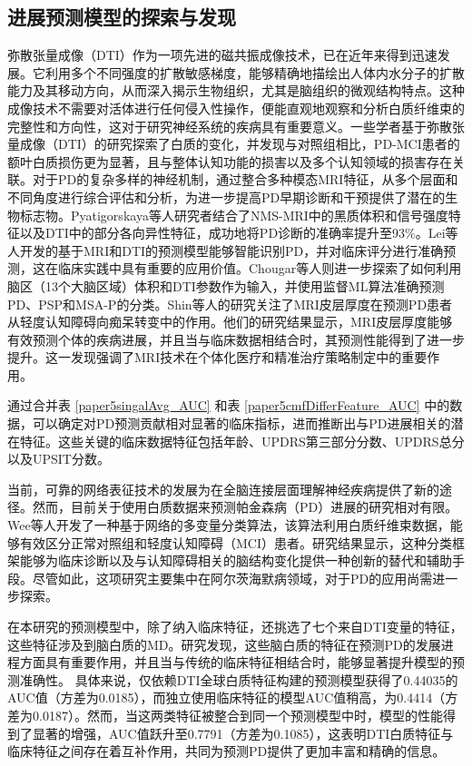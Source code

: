 \subsection{进展预测模型的探索与发现}  
弥散张量成像（DTI）作为一项先进的磁共振成像技术，已在近年来得到迅速发展。它利用多个不同强度的扩散敏感梯度，能够精确地描绘出人体内水分子的扩散能力及其移动方向，从而深入揭示生物组织，尤其是脑组织的微观结构特点。这种成像技术不需要对活体进行任何侵入性操作，便能直观地观察和分析白质纤维束的完整性和方向性，这对于研究神经系统的疾病具有重要意义。一些学者基于弥散张量成像（DTI）的研究探索了白质的变化，并发现与对照组相比，PD-MCI患者的额叶白质损伤更为显著，且与整体认知功能的损害以及多个认知领域的损害存在关联\cite{wang2020changes}。对于PD的复杂多样的神经机制，通过整合多种模态MRI特征，从多个层面和不同角度进行综合评估和分析，为进一步提高PD早期诊断和干预提供了潜在的生物标志物\cite{pyatigorskaya2018comparative,gu2016automatic,bowman2016multimodal}。Pyatigorskaya等人\cite{pyatigorskaya2018comparative}研究者结合了NMS-MRI中的黑质体积和信号强度特征以及DTI中的部分各向异性特征，成功地将PD诊断的准确率提升至93\%。Lei等人\cite{lei2018longitudinal,lei2017joint}开发的基于MRI和DTI的预测模型能够智能识别PD，并对临床评分进行准确预测，这在临床实践中具有重要的应用价值。Chougar等人\cite{chougar2021automated}则进一步探索了如何利用脑区（13个大脑区域）体积和DTI参数作为输入，并使用监督ML算法准确预测PD、PSP和MSA-P的分类。Shin等人\cite{shin2021cortical}的研究关注了MRI皮层厚度在预测PD患者从轻度认知障碍向痴呆转变中的作用。他们的研究结果显示，MRI皮层厚度能够有效预测个体的疾病进展，并且当与临床数据相结合时，其预测性能得到了进一步提升。这一发现强调了MRI技术在个体化医疗和精准治疗策略制定中的重要作用。

通过合并表 \ref{paper5singalAvg_AUC} 和表 \ref{paper5cmfDifferFeature_AUC} 中的数据，可以确定对PD预测贡献相对显著的临床指标，进而推断出与PD进展相关的潜在特征。这些关键的临床数据特征包括年龄、UPDRS第三部分分数、UPDRS总分以及UPSIT分数。

当前，可靠的网络表征技术的发展为在全脑连接层面理解神经疾病提供了新的途径。然而，目前关于使用白质数据来预测帕金森病（PD）进展的研究相对有限。Wee等人\cite{wee2011enriched}开发了一种基于网络的多变量分类算法，该算法利用白质纤维束数据，能够有效区分正常对照组和轻度认知障碍（MCI）患者。研究结果显示，这种分类框架能够为临床诊断以及与认知障碍相关的脑结构变化提供一种创新的替代和辅助手段。尽管如此，这项研究主要集中在阿尔茨海默病领域，对于PD的应用尚需进一步探索。


在本研究的预测模型中，除了纳入临床特征，还挑选了七个来自DTI变量的特征，这些特征涉及到脑白质的MD。研究发现，这些脑白质的特征在预测PD的发展进程方面具有重要作用，并且当与传统的临床特征相结合时，能够显著提升模型的预测准确性。
具体来说，仅依赖DTI全球白质特征构建的预测模型获得了0.44035的AUC值（方差为0.0185），而独立使用临床特征的模型AUC值稍高，为0.4414（方差为0.0187）。然而，当这两类特征被整合到同一个预测模型中时，模型的性能得到了显著的增强，AUC值跃升至0.7791（方差为0.1085），这表明DTI白质特征与临床特征之间存在着互补作用，共同为预测PD提供了更加丰富和精确的信息。


